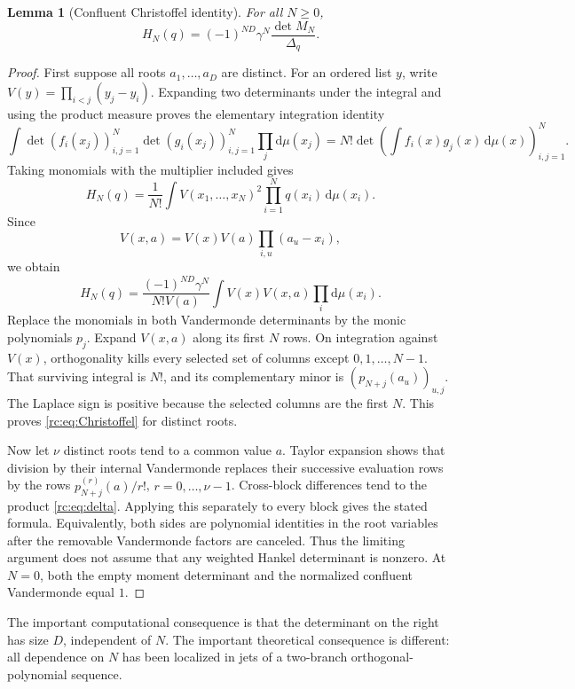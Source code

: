 \documentclass[11pt,a4paper]{article}
\numberwithin{equation}{section}
\newtheorem{lemma}[theorem]{Lemma}
\theoremstyle{definition}
\theoremstyle{remark}
\newcommand{\dd}{\mathrm d}
\begin{document}
\begin{lemma}[Confluent Christoffel identity]\label{rc:lem:Christoffel}
For all $N\ge0$,
\begin{equation}\label{rc:eq:Christoffel}
 H_N(q)=(-1)^{ND}\gamma^N\frac{\det M_N}{\Delta_q}.
\end{equation}
\end{lemma}
\begin{proof}
First suppose all roots $a_1,\ldots,a_D$ are distinct.  For an ordered
list $y$, write $V(y)=\prod_{i<j}(y_j-y_i)$.  Expanding two determinants
under the integral and using the product measure proves the elementary
integration identity
\[
 \int\det(f_i(x_j))_{i,j=1}^{N}\det(g_i(x_j))_{i,j=1}^{N}
       \prod_j\dd\mu(x_j)
 =N!\det\left(\int f_i(x)g_j(x)\,\dd\mu(x)\right)_{i,j=1}^{N}.
\]
Taking monomials with the multiplier included gives
\[
 H_N(q)=\frac1{N!}\int V(x_1,\ldots,x_N)^2
                      \prod_{i=1}^N q(x_i)\,\dd\mu(x_i).
\]
Since
\[
 V(x,a)=V(x)V(a)\prod_{i,u}(a_u-x_i),
\]
we obtain
\begin{equation}\label{rc:eq:mixedintegral}
 H_N(q)=\frac{(-1)^{ND}\gamma^N}{N!V(a)}
             \int V(x)V(x,a)\prod_i\dd\mu(x_i).
\end{equation}
Replace the monomials in both Vandermonde determinants by the monic
polynomials $p_j$.  Expand $V(x,a)$ along its first $N$ rows.  On
integration against $V(x)$, orthogonality kills every selected set of
columns except $0,1,\ldots,N-1$.  That surviving integral is $N!$, and
its complementary minor is $(p_{N+j}(a_u))_{u,j}$.  The Laplace sign is
positive because the selected columns are the first $N$.  This proves
\eqref{rc:eq:Christoffel} for distinct roots.

Now let $\nu$ distinct roots tend to a common value $a$.  Taylor expansion
shows that division by their internal Vandermonde replaces their
successive evaluation rows by the rows $p_{N+j}^{(r)}(a)/r!$,
$r=0,\ldots,\nu-1$.  Cross-block differences tend to the product
\eqref{rc:eq:delta}.  Applying this separately to every block gives the
stated formula.  Equivalently, both sides are polynomial identities in
the root variables after the removable Vandermonde factors are canceled.
Thus the limiting argument does not assume that any weighted Hankel
determinant is nonzero.  At $N=0$, both the empty moment determinant and
the normalized confluent Vandermonde equal $1$.
\end{proof}

The important computational consequence is that the determinant on the
right has size $D$, independent of $N$.  The important theoretical
consequence is different: all dependence on $N$ has been localized in
jets of a two-branch orthogonal-polynomial sequence.
\end{document}
